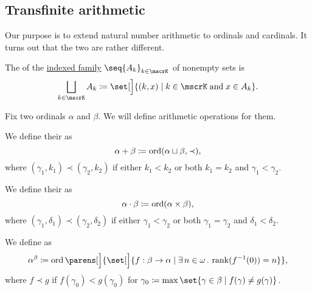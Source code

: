 \subsection{Transfinite arithmetic}\label{subsec:ordinal_and_cardinal_arithmetic}

Our purpose is to extend natural number arithmetic to ordinals and cardinals. It turns out that the two are rather different.

\begin{definition}\label{def:disjoint_union}
  The  of the \hyperref[def:indexed_family]{indexed family} \( \seq{ A_k }_{k \in \mscrK} \) of nonempty sets is
  \begin{equation*}
    \bigsqcup_{k \in \mscrK} A_k \coloneqq \set[\Big]{ (k, x) \given k \in \mscrK \T{and} x \in A_k }.
  \end{equation*}
\end{definition}

\begin{definition}\label{def:ordinal_arithmetic}
  Fix two ordinals \( \alpha \) and \( \beta \). We will define arithmetic operations for them.

  \begin{thmenum}
     We define their  as
    \begin{equation*}
      \alpha + \beta \coloneqq \operatorname{ord}(\alpha \sqcup \beta, \prec),
    \end{equation*}
    where \( (\gamma_1, k_1) \prec (\gamma_2, k_2) \) if either \( k_1 < k_2 \) or both \( k_1 = k_2 \) and \( \gamma_1 < \gamma_2 \).

     We define their  as
    \begin{equation*}
      \alpha \cdot \beta \coloneqq \operatorname{ord}(\alpha \times \beta),
    \end{equation*}
    where \( (\gamma_1, \delta_1) \prec (\gamma_2, \delta_2) \) if either \( \gamma_1 < \gamma_2 \) or both \( \gamma_1 = \gamma_2 \) and \( \delta_1 < \delta_2 \).

     We define  as
    \begin{equation*}
      \alpha^\beta \coloneqq \ord\parens[\Big]{ \set[\Big]{ f: \beta \to \alpha \given \qexists {n \in \omega} \rank(f^{-1}(0)) = n } },
    \end{equation*}
    where \( f \prec g \) if \( f(\gamma_0) < g(\gamma_0) \) for \( \gamma_0 \coloneqq \max\set{ \gamma \in \beta \given f(\gamma) \neq g(\gamma) } \).
  \end{thmenum}
\end{definition}

